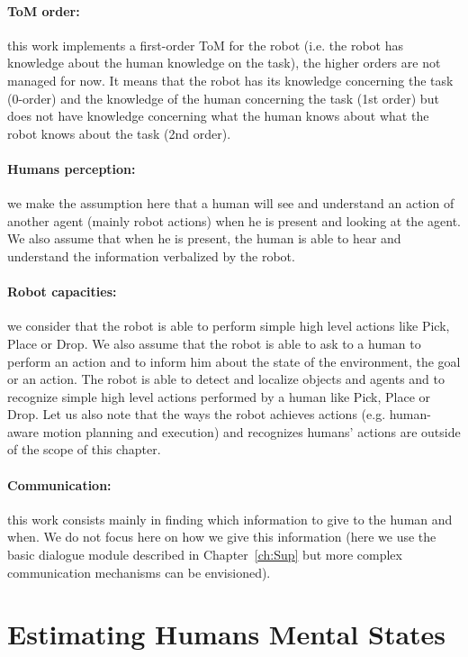 \documentclass[english,a4paper,11pt,twoside]{StyleThese}
\begin{document}
\paragraph{ToM order:} this work implements a first-order ToM for the robot (i.e. the robot has knowledge about the human knowledge on the task), the higher orders are not managed for now. It means that the robot has its knowledge concerning the task (0-order) and the knowledge of the human concerning the task (1st order) but does not have knowledge concerning what the human knows about what the robot knows about the task (2nd order).

\paragraph{Humans perception:} we make the assumption here that a human will see and understand an action of another agent (mainly robot actions) when he is present and looking at the agent. We
also assume that when he is present, the human is able to hear and understand the information verbalized by the robot.

\paragraph{Robot capacities:} we consider that the robot is able to perform simple high level actions like Pick, Place or Drop. We also assume that the robot is able to ask to a human to perform an action and to inform him about the state of the environment, the goal or an action. The robot is able to detect and localize objects and agents
and to recognize simple high level actions performed by a human like Pick, Place or Drop. Let us also note that the ways the robot achieves actions (e.g. human-aware motion planning and execution) and recognizes humans’ actions are outside of the scope of this chapter.

\paragraph{Communication:} this work consists mainly in finding which information to give to the human and when. We do not focus here on how we give this information (here we use the basic dialogue module described in Chapter~\ref{ch:Sup} but more complex communication mechanisms can be envisioned). 

\section{Estimating Humans Mental States}
\end{document}
